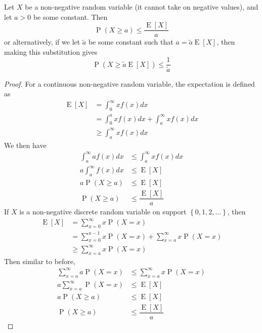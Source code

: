 \documentclass[11pt]{report} %
\begin{document}
Let $X$ be a non-negative random variable (it cannot take on negative values), and let $a > 0$ be some constant. Then
\begin{equation}
\operatorname{P}\left(X\geq a\right) \leq \dfrac{\operatorname{E}\left[X\right]}{a}
\end{equation}
or alternatively, if we let $\tilde{a}$ be some constant such that $a = \tilde{a}\operatorname{E}\left[X\right]$, then making this substitution gives
\begin{equation}
\operatorname{P}\left(X\geq \tilde{a}\operatorname{E}\left[X\right]\right) \leq \dfrac{1}{\tilde{a}}
\end{equation}
\begin{proof}
For a continuous non-negative random variable, the expectation is defined as
\begin{align}
\operatorname{E}\left[X\right] &= \int_{0}^{\infty}xf\left(x\right)dx \\
&= \int_{0}^{a}xf\left(x\right)dx + \int_{a}^{\infty}xf\left(x\right)dx \\
&\geq \int_{a}^{\infty}xf\left(x\right)dx
\end{align}
We then have
\begin{align}
\int_{a}^{\infty}af\left(x\right)dx &\leq \int_{a}^{\infty}xf\left(x\right)dx \\
a\int_{a}^{\infty}f\left(x\right)dx &\leq \operatorname{E}\left[X\right] \\
a\operatorname{P}\left(X \geq a\right) &\leq \operatorname{E}\left[X\right] \\
\operatorname{P}\left(X \geq a\right) &\leq \dfrac{\operatorname{E}\left[X\right]}{a}
\end{align}
If $X$ is a non-negative discrete random variable on support $\left\{0, 1, 2, \dots\right\}$, then
\begin{align}
\operatorname{E}\left[X\right] &= \sum_{x = 0}^{\infty}x\operatorname{P}\left(X = x\right) \\
&= \sum_{x = 0}^{a - 1}x\operatorname{P}\left(X = x\right) + \sum_{x = a}^{\infty}x\operatorname{P}\left(X = x\right) \\
&\geq \sum_{x = a}^{\infty}x\operatorname{P}\left(X = x\right)
\end{align}
Then similar to before,
\begin{align}
\sum_{x = a}^{\infty}a\operatorname{P}\left(X = x\right) &\leq \sum_{x = a}^{\infty}x\operatorname{P}\left(X = x\right) \\
a\sum_{x = a}^{\infty}\operatorname{P}\left(X = x\right) &\leq \operatorname{E}\left[X\right] \\
a\operatorname{P}\left(X \geq a\right) &\leq \operatorname{E}\left[X\right] \\
\operatorname{P}\left(X \geq a\right) &\leq \dfrac{\operatorname{E}\left[X\right]}{a}
\end{align}
\end{proof}
\end{document}
